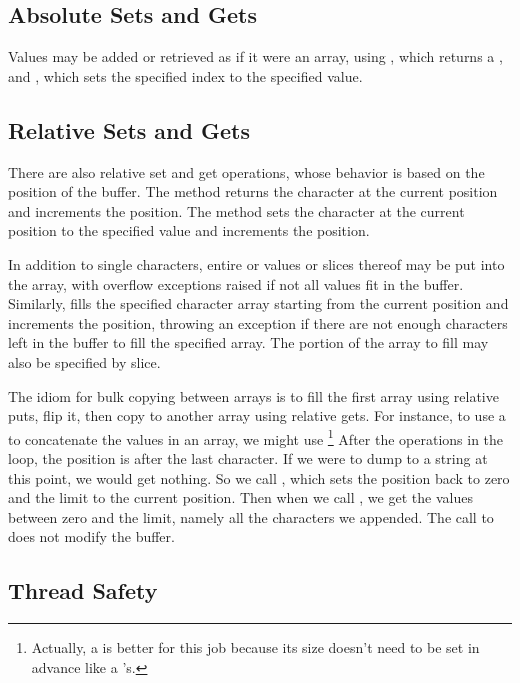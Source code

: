 \subsection{Absolute Sets and Gets}

Values may be added or retrieved as if it were an array, using
, which returns a
, and , which sets the specified index
to the specified  value.

\subsection{Relative Sets and Gets}

There are also relative set and get operations, whose behavior is
based on the position of the buffer.  The  method returns
the character at the current position and increments the position.
The  method sets the character at the current position
to the specified value and increments the position.  

In addition to single characters, entire  or
 values or slices thereof may be put into the array, with
overflow exceptions raised if not all values fit in the buffer.
Similarly,  fills the specified character array
starting from the current position and increments the position,
throwing an exception if there are not enough characters left in the
buffer to fill the specified array.  The portion of the array to fill
may also be specified by slice.

The idiom for bulk copying between arrays is to fill the first array
using relative puts, flip it, then copy to another array using
relative gets.  For instance, to use a  to concatenate
the values in an array, we might use%
%
\footnote{Actually, a  is better for this job
because its size doesn't need to be set in advance like a
's.}%
%
%
After the  operations in the loop, the position is
after the last character.  If we were to dump to a string at this
point, we would get nothing.  So we call , which
sets the position back to zero and the limit to the current
position.  Then when we call , we get the values
between zero and the limit, namely all the characters we appended.
The call to  does not modify the buffer.




\subsection{Thread Safety}

